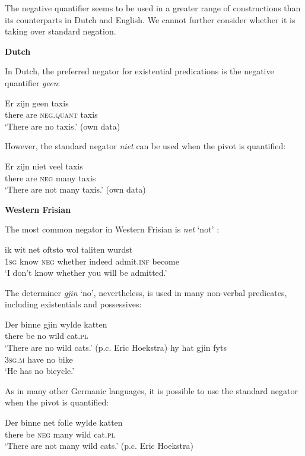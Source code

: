 \documentclass[output=paper]{langsci/langscibook}
\begin{document}
\begin{unindented}
The negative quantifier seems to be used in a greater range of constructions than its counterparts in Dutch and English. We cannot further consider  whether it is taking over standard negation. 

\textbf{Dutch} 

In Dutch, the preferred negator for existential predications is the negative quantifier \textit{geen}: 
%
\begin{exe}\ex \gll Er zijn geen   taxis \\
there are \textsc{neg.quant} taxis \\
    \glt `There are no taxis.' (own data)
    \end{exe}

However, the standard negator \textit{niet} can be used when the pivot is quantified:
%
\begin{exe}\ex \gll Er zijn niet  veel   taxis \\
there are  \textsc{neg} many taxis \\
    \glt `There are not many taxis.' (own data)
    \end{exe}

\textbf{Western Frisian}

The most common negator in Western Frisian is \textit{net} `not' \citep[102--103]{Tiersma1999}:
%
\begin{exe}\ex \gll ik wit net  oftsto wol taliten wurdst \\
\textsc{1sg} know \textsc{neg} whether indeed admit.\textsc{inf} become \\
    \glt `I don't know whether you will be admitted.' \citep[91]{Tiersma1999}
    \end{exe}

The determiner \textit{gjin} `no', nevertheless, is used in many non-verbal predicates, including existentials and possessives:
%
\begin{exe}\ex \gll Der binne gjin wylde katten \\
there be no wild cat.\textsc{pl}
        \\
    \glt `There are no wild cats.' (p.c. Eric Hoekstra) 
\ex \gll hy hat gjin fyts \\
\textsc{3sg.m} have no   bike \\
    \glt `He has no bicycle.' \citep[102]{Tiersma1999}
    \end{exe}

As in many other Germanic languages, it is possible to use the standard negator when the pivot is quantified:
%
\begin{exe}\ex \gll Der   binne net   folle  wylde katten \\
there be \textsc{neg} many wild   cat.\textsc{pl} \\
    \glt `There are not many wild cats.' (p.c. Eric Hoekstra)
    \end{exe}


\end{unindented}
\end{document}
